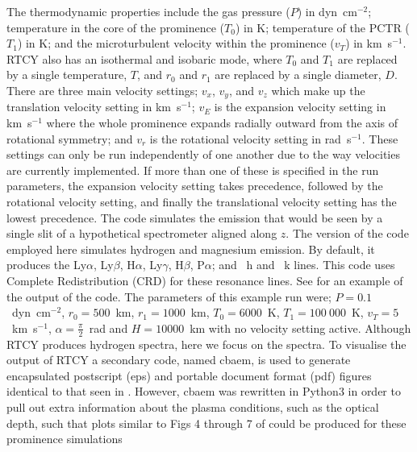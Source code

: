The thermodynamic properties include the gas pressure ($P$) in dyn~cm$^{-2}$; temperature in the core of the prominence ($T_0$) in K; temperature of the PCTR ($T_1$) in K; and the microturbulent velocity within the prominence ($v_T$) in km~s$^{-1}$. RTCY also has an isothermal and isobaric mode, where $T_0$ and $T_1$ are replaced by a single temperature, $T$, and $r_0$ and $r_1$ are replaced by a single diameter, $D$.
There are three main velocity settings; $v_x$, $v_y$, and $v_z$ which make up the translation velocity setting in km~s$^{-1}$; $v_E$ is the expansion velocity setting in km~s$^{-1}$ where the whole prominence expands radially outward from the axis of rotational symmetry; and $v_r$ is the rotational velocity setting in rad~s$^{-1}$. These settings can only be run independently of one another due to the way velocities are currently implemented. If more than one of these is specified in the run parameters, the expansion velocity setting takes precedence, followed by the rotational velocity setting, and finally the translational velocity setting has the lowest precedence. 
The code simulates the emission that would be seen by a single slit of a hypothetical spectrometer aligned along $z$. The version of the code employed here simulates hydrogen and magnesium emission. By default, it produces the Ly$\alpha$, Ly$\beta$, H$\alpha$, Ly$\gamma$, H$\beta$, P$\alpha$; and \mgii{}~h and \mgii{}~k lines. This code uses Complete Redistribution (CRD) for these resonance lines. See  for an example of the output of the code. The parameters of this example run were; $P=0.1$~dyn~cm$^{-2}$, $r_0=500$~km, $r_1=1000$~km, $T_0=6000$~K, $T_1=100~000$~K, $v_T=5$~km~s$^{-1}$, $\alpha=\frac{\pi}{2}$~rad and $H=10000$~km with no velocity setting active. Although RTCY produces hydrogen spectra, here we focus on the \mgiihk{} spectra.
To visualise the output of RTCY a secondary code, named cbaem, is used to generate encapsulated postscript (eps) and portable document format (pdf) figures identical to that seen in . However, cbaem was rewritten in Python3 in order to pull out extra information about the plasma conditions, such as the optical depth, such that plots similar to Figs 4 through 7 of \cite{carlsson_formation_1997} could be produced for these prominence simulations 


